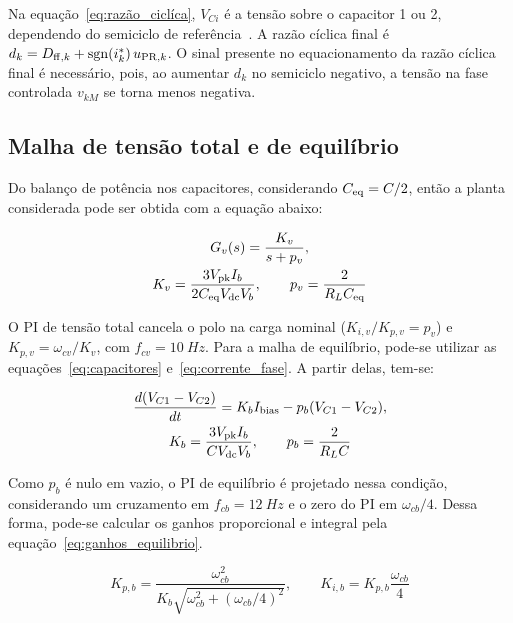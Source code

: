 Na equação~\eqref{eq:razão_ciclíca}, $V_{Ci}$ é a tensão sobre o capacitor 1 ou 2, dependendo
do semiciclo de referência~\cite{alahuhtala2006fourwire}. A razão cíclica final é $d_k=D_{\mathrm{ff},k}+\operatorname{sgn}(i_k^*)\,u_{\mathrm{PR},k}$.
O sinal presente no equacionamento da razão cíclica final é necessário, pois, ao aumentar $d_k$ no semiciclo negativo,
a tensão na fase controlada $v_{kM}$ se torna menos negativa.

\subsection{Malha de tensão total e de equilíbrio}

Do balanço de potência nos capacitores, considerando $C_{\mathrm{eq}}=C/2$, então a planta considerada pode
ser obtida com a equação abaixo:

\begin{equation}
    \begin{gathered}
        G_v(s) = \frac{K_v}{s+p_v},\\
        K_v = \frac{3V_{\mathrm{pk}}I_b}{2C_{\mathrm{eq}}V_{\mathrm{dc}}V_b}, \qquad p_v = \frac{2}{R_LC_{\mathrm{eq}}}
    \end{gathered}
    \label{eq:planta_tensao}
\end{equation}

O PI de tensão total cancela o polo na carga nominal ($K_{i,v}/K_{p,v}=p_v$) e $K_{p,v} = \omega_{cv}/K_v$, com $f_{cv} = \SI{10}{Hz}$. Para a malha 
de equilíbrio, pode-se utilizar as equações~\eqref{eq:capacitores} e~\eqref{eq:corrente_fase}. A partir delas, tem-se:

\begin{equation}
    \begin{gathered}
        \frac{d(V_{C1}-V_{C2})}{dt} = K_bI_{\mathrm{bias}}-p_b(V_{C1}-V_{C2}),\\
        K_b = \frac{3V_{\mathrm{pk}}I_b}{CV_{\mathrm{dc}}V_b}, \qquad p_b = \frac{2}{R_LC}
    \end{gathered}
    \label{eq:planta_equilibrio}
\end{equation}

Como $p_b$ é nulo em vazio, o PI de equilíbrio é projetado nessa condição, considerando um cruzamento em $f_{cb}=\SI{12}{Hz}$ e o zero do PI em $\omega_{cb}/4$. Dessa forma, pode-se calcular
os ganhos proporcional e integral pela equação~\eqref{eq:ganhos_equilibrio}.

\begin{equation}
    K_{p,b} = \frac{\omega^2_{cb}}{K_b\sqrt{\omega^2_{cb}+(\omega_{cb}/4)^2}}, \qquad K_{i,b} = K_{p,b}\frac{\omega_{cb}}{4}
    \label{eq:ganhos_equilibrio}
\end{equation}

